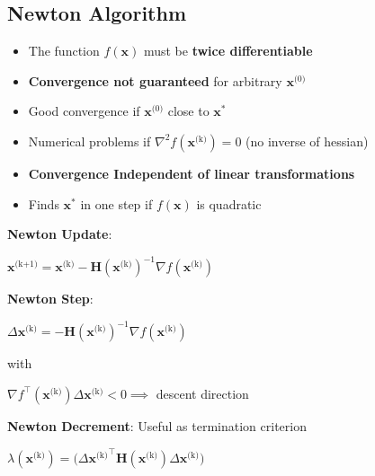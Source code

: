 \documentclass[english]{latex4ei/latex4ei_sheet}
\begin{document}
\begin{sectionbox}
	\subsection{Newton Algorithm}
	\vspace{0.3em}
	\begin{itemize}
		\item The function $f(\bm{x})$ must be \textbf{twice differentiable}
		\item \textbf{Convergence not guaranteed} for arbitrary $\bm{x}^{\text{(0)}}$
		\item Good convergence if $\bm{x}^{\text{(0)}}$ close to $\bm{x}^*$
		\item Numerical problems if $\nabla^2f(\bm{x}^{\text{(k)}}) = 0$ (no inverse of hessian)
		\item \textbf{Convergence Independent of linear transformations}
		\item Finds $\bm{x}^*$ in one step if $f(\bm{x})$ is quadratic
	\end{itemize}
	\begin{emphbox}
		\textbf{Newton Update}:
		\begin{center}
			$\bm{x}^{\text{(k+1)}} = \bm{x}^{\text{(k)}} - \bm{H}(\bm{x}^{\text{(k)}})^{-1}\nabla f(\bm{x}^{\text{(k)}})$
		\end{center}
	\end{emphbox}
	\textbf{Newton Step}:
	\begin{center}
		$\Delta \bm{x}^{\text{(k)}} = -\bm{H}(\bm{x}^{\text{(k)}})^{-1}\nabla f(\bm{x}^{\text{(k)}})$
	\end{center}
	with
	\begin{center}
		$\nabla f^\intercal(\bm{x}^{\text{(k)}})\Delta\bm{x}^{\text{(k)}} < 0 \implies$ descent direction
	\end{center}
	\textbf{Newton Decrement}: Useful as termination criterion
	\begin{center}
		$\lambda(\bm{x}^{\text{(k)}}) = \big( \Delta {\bm{x}^{\text{(k)}}}^\intercal \bm{H}(\bm{x}^{\text{(k)}}) \Delta \bm{x}^{\text{(k)}} \big)$
	\end{center}
\end{sectionbox}
\end{document}

